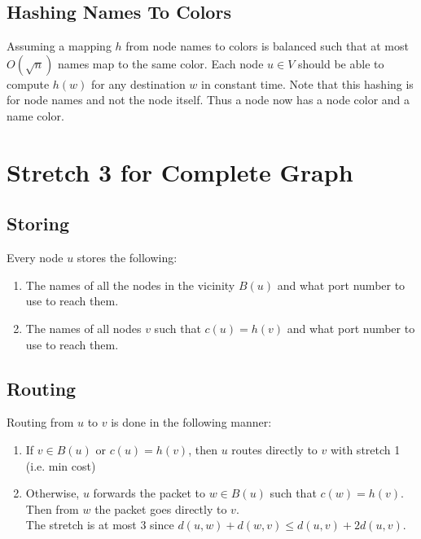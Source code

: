 

\subsection{Hashing Names To Colors}
Assuming a mapping $h$ from node names to colors is balanced such that at most $O(\sqrt{n})$ names map to the same color. Each node $u\in V$ should be able to compute $h(w)$ for any destination $w$ in constant time. Note that this hashing is for node names and not the node itself. Thus a node now has a node color and a name color.

\section{Stretch 3 for Complete Graph}
\subsection{Storing}
Every node $u$ stores the following:
\begin{enumerate}
    \item The names of all the nodes in the vicinity $B(u)$ and what port number to use to reach them.
    \item The names of all nodes $v$ such that $c(u)=h(v)$ and what port number to use to reach them.
\end{enumerate}

\subsection{Routing}
Routing from $u$ to $v$ is done in the following manner:
\begin{enumerate}
    \item If $v\in B(u)$ or $c(u)=h(v)$, then $u$ routes directly to $v$ with stretch 1 (i.e. min cost)
    \item Otherwise, $u$ forwards the packet to $w\in B(u)$ such that $c(w)=h(v)$. Then from $w$ the packet goes directly to $v$.\\
        The stretch is at most $3$ since $d(u,w) + d(w,v) \leq d(u,v)+2d(u,v)$.
\end{enumerate}

